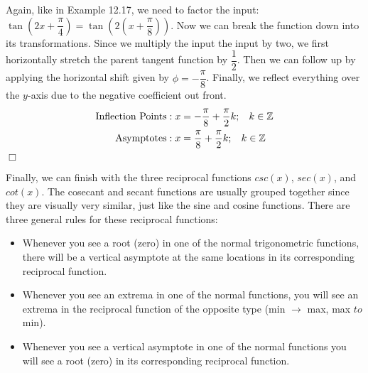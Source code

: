 \documentclass[lang=en,11pt]{elegantbook}
\begin{document}
\begin{solution}
Again, like in Example 12.17, we need to factor the input: $\tan\left(2x+\dfrac{\pi}{4}\right)=\tan\left(2\left(x+\dfrac{\pi}{8}\right)\right)$. Now we can break the function down into its transformations. Since we multiply the input the input by two, we first horizontally stretch the parent tangent function by $\dfrac{1}{2}$. Then we can follow up by applying the horizontal shift given by $\phi=-\dfrac{\pi}{8}$. Finally, we reflect everything over the $y$-axis due to the negative coefficient out front. \begin{align*}
    \text{Inflection Points}&: x=-\dfrac{\pi}{8}+\dfrac{\pi}{2}k;\hspace{3mm}k\in\mathbb{Z}\\
    \text{Asymptotes}&: x=\dfrac{\pi}{8}+\dfrac{\pi}{2}k;\hspace{3mm} k\in\mathbb{Z}
\end{align*} $\Box$
\end{solution}
Finally, we can finish with the three reciprocal functions $csc⁡(x)$, $sec⁡(x)$, and $cot⁡(x)$. The cosecant and secant functions are usually grouped together since they are visually very similar, just like the sine and cosine functions. There are three general rules for these reciprocal functions: \begin{itemize}
    \item 	Whenever you see a root (zero) in one of the normal trigonometric functions, there will be a vertical asymptote at the same locations in its corresponding reciprocal function.
	\item Whenever you see an extrema in one of the normal functions, you will see an extrema in the reciprocal function of the opposite type (min $\to$ max, max $to$ min).
	\item Whenever you see a vertical asymptote in one of the normal functions you will see a root (zero) in its corresponding reciprocal function.
\end{itemize}
\end{document}
